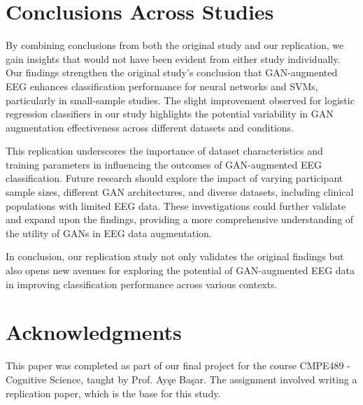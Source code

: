 \documentclass[10pt,letterpaper]{article}
\begin{document}
\section{Conclusions Across Studies}
By combining conclusions from both the original study and our replication, we gain insights that would not have been evident from either study individually. Our findings strengthen the original study's conclusion that GAN-augmented EEG enhances classification performance for neural networks and SVMs, particularly in small-sample studies. The slight improvement observed for logistic regression classifiers in our study highlights the potential variability in GAN augmentation effectiveness across different datasets and conditions. 

This replication underscores the importance of dataset characteristics and training parameters in influencing the outcomes of GAN-augmented EEG classification. Future research should explore the impact of varying participant sample sizes, different GAN architectures, and diverse datasets, including clinical populations with limited EEG data. These investigations could further validate and expand upon the findings, providing a more comprehensive understanding of the utility of GANs in EEG data augmentation.

In conclusion, our replication study not only validates the original findings but also opens new avenues for exploring the potential of GAN-augmented EEG data in improving classification performance across various contexts.

\section{Acknowledgments}

This paper was completed as part of our final project for the course CMPE489 - Cognitive Science, taught by Prof. Ayşe Başar. The assignment involved writing a replication paper, which is the base for this study.


\nocite{dataset1}
\nocite{dataset2}
\nocite{originalpaper}
\nocite{ourdataset}
\nocite{originaldataset}
\nocite{gan}




\setlength{\bibleftmargin}{.125in}
\setlength{\bibindent}{-\bibleftmargin}


\end{document}
